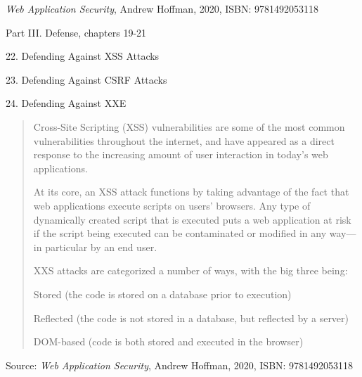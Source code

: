 \documentclass[Screen16to9,17pt]{foils}
\begin{document}

\emph{Web Application Security}, Andrew Hoffman, 2020, ISBN: 9781492053118

\begin{list1}
\item Part III. Defense, chapters 19-21
\item 22. Defending Against XSS Attacks
\item 23. Defending Against CSRF Attacks
\item 24. Defending Against XXE
\end{list1}





\begin{quote}
Cross-Site Scripting (XSS) vulnerabilities are some of the most common vulnerabilities throughout the internet, and have appeared as a direct response to the increasing amount of user interaction in today’s web applications.

At its core, an XSS attack functions by taking advantage of the fact that web applications execute scripts on users’ browsers. Any type of dynamically created script that is executed puts a web application at risk if the script being executed can be contaminated or modified in any way—in particular by an end user.

XXS attacks are categorized a number of ways, with the big three being:
\begin{list2}
\item Stored (the code is stored on a database prior to execution)
\item Reflected (the code is not stored in a database, but reflected by a server)
\item DOM-based (code is both stored and executed in the browser)
\end{list2}
\end{quote}

Source: \emph{Web Application Security}, Andrew Hoffman, 2020, ISBN: 9781492053118



\end{document}
